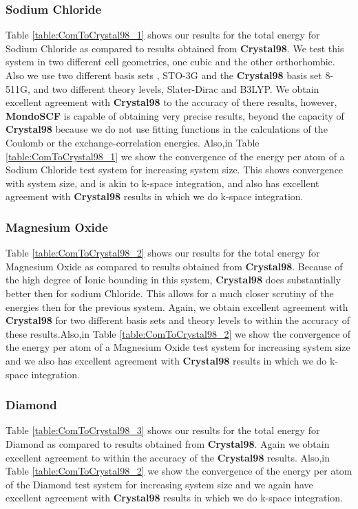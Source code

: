 \commentoutA{\documentclass[prb,aps,twocolumn,showpacs,twocolumngrid,superbib]{revtex4}}
\begin{document}
\subsubsection{Sodium Chloride}

Table \ref{table:ComToCrystal98_1} shows our results for the total
energy for Sodium Chloride as compared to results obtained from \textbf{Crystal98}.
We test this system in two different cell geometries, one cubic and
the other orthorhombic. Also we use two different basis sets , STO-3G
and the \textbf{Crystal98} basis set 8-511G, and two different theory levels, 
Slater-Dirac and B3LYP. We obtain excellent agreement with \textbf{Crystal98} to the accuracy
of there results, however, \textbf{MondoSCF} is capable of obtaining
very precise results, beyond the capacity of \textbf{Crystal98} because
we do not use fitting functions in the calculations of the Coulomb
or the exchange-correlation energies. Also,in Table \ref{table:ComToCrystal98_1}
we show the convergence of the energy per atom of a Sodium Chloride
test system for increasing system size. This shows convergence with
system size, and is akin to k-space integration, and also has excellent agreement
with \textbf{Crystal98} results in which we do k-space integration. 


\subsubsection{Magnesium Oxide}

Table \ref{table:ComToCrystal98_2} shows our results for the total
energy for Magnesium Oxide as compared to results obtained from \textbf{Crystal98}.
Because of the high degree of Ionic bounding in this system, \textbf{Crystal98}
does substantially better then for sodium Chloride. This allows for
a much closer scrutiny of the energies then for the previous system.
Again, we obtain excellent agreement with \textbf{Crystal98} for two
different basis sets and theory levels to within the accuracy of these
results.Also,in Table \ref{table:ComToCrystal98_2}
we show the convergence of the energy per atom of a Magnesium Oxide
test system for increasing system size and we also has excellent agreement
with \textbf{Crystal98} results in which we do k-space integration.


\subsubsection{Diamond}

Table \ref{table:ComToCrystal98_3} shows our results for the total
energy for Diamond as compared to results obtained from \textbf{Crystal98}.
Again we obtain excellent agreement to within the accuracy of the
\textbf{Crystal98} results.
Also,in Table \ref{table:ComToCrystal98_2}
we show the convergence of the energy per atom of the Diamond
test system for increasing system size and we again have excellent agreement
with \textbf{Crystal98} results in which we do k-space integration.
\end{document}
